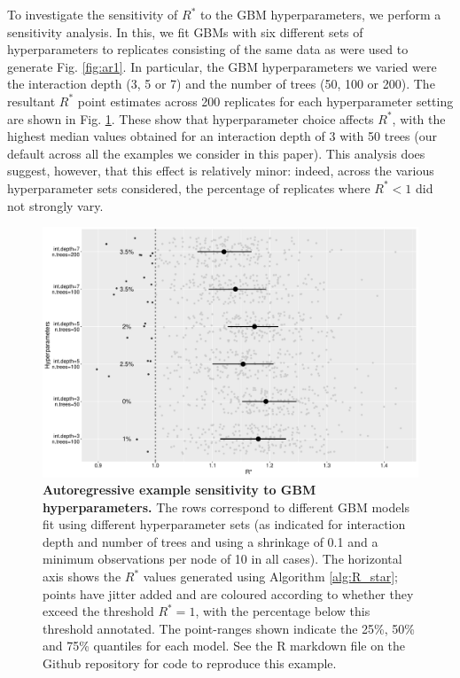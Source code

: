 \documentclass{article}
\begin{document}
To investigate the sensitivity of $R^*$ to the GBM hyperparameters, we perform a sensitivity analysis. In this, we fit GBMs with six different sets of hyperparameters to replicates consisting of the same data as were used to generate Fig. \ref{fig:ar1}. In particular, the GBM hyperparameters we varied were the interaction depth (3, 5 or 7) and the number of trees (50, 100 or 200). The resultant $R^*$ point estimates across 200 replicates for each hyperparameter setting are shown in Fig. \ref{fig:ar1_sensitivity}. These show that hyperparameter choice affects $R^*$, with the highest median values obtained for an interaction depth of 3 with 50 trees (our default across all the examples we consider in this paper). This analysis does suggest, however, that this effect is relatively minor: indeed, across the various hyperparameter sets considered, the percentage of replicates where $R^*<1$ did not strongly vary.

\begin{figure}[!htb]
	\centerline{\includegraphics[width=1.0\textwidth]{../output/ar1_sensitivity.pdf}}
	\caption{\textbf{Autoregressive example sensitivity to GBM hyperparameters.} The rows correspond to different GBM models fit using different hyperparameter sets (as indicated for interaction depth and number of trees and using a shrinkage of 0.1 and a minimum observations per node of 10 in all cases). The horizontal axis shows the $R^*$ values generated using Algorithm \ref{alg:R_star}; points have jitter added and are coloured according to whether they exceed the threshold $R^*=1$, with the percentage below this threshold annotated. The point-ranges shown indicate the 25\%, 50\% and 75\% quantiles for each model. See the R markdown file on the Github repository for code to reproduce this example.}
	\label{fig:ar1_sensitivity}
\end{figure}
\end{document}
